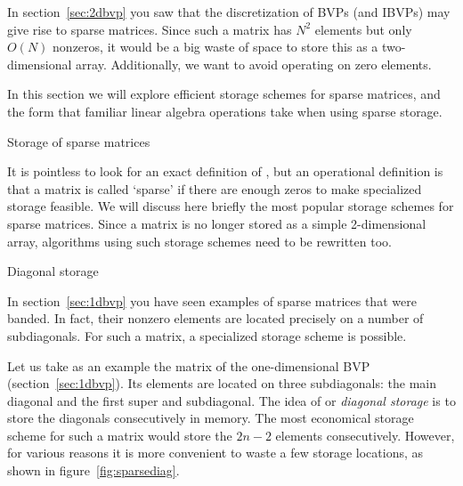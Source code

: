 
In section~\ref{sec:2dbvp} you saw that the discretization of
\ac{BVP}s (and \ac{IBVP}s) may give rise to sparse matrices.
Since such a matrix has $N^2$ elements but only $O(N)$
nonzeros, it would be a big waste of space to store this as a two-dimensional
array. Additionally, we want to avoid operating on zero elements.

In this section we will explore efficient storage schemes for sparse
matrices, and the form that familiar linear algebra operations take
when using sparse storage.

 {Storage of sparse matrices}
\label{sec:spmvp}


It is pointless to look for an exact definition of
, but an operational definition is that a
matrix is called `sparse' if there are enough zeros to make
specialized storage feasible. We will discuss here briefly the most
popular storage schemes for sparse matrices.
Since a matrix is no longer stored as a simple 2-dimensional array,
algorithms using such storage schemes need to be rewritten too. 

 {Diagonal storage}
\label{sec:diagonal-storage}

In section~\ref{sec:1dbvp} you have seen examples of sparse matrices
that were banded. In fact, their nonzero elements are located
precisely on a number of subdiagonals. For such a matrix, a
specialized storage scheme is possible.

Let us take as an example the matrix of the one-dimensional \ac{BVP}
(section~\ref{sec:1dbvp}). Its elements are located on three
subdiagonals: the main diagonal and the first super and
subdiagonal. The idea of  or
\emph{diagonal storage} is to store the diagonals consecutively
in memory. The most economical storage scheme for such a matrix would
store the $2n-2$ elements consecutively. However, for various reasons
it is more convenient to waste a few storage locations, as shown in
figure~\ref{fig:sparsediag}.

